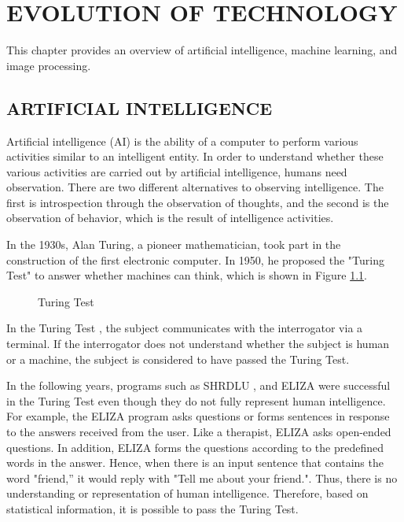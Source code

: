 \chapter{EVOLUTION OF TECHNOLOGY}\label{chp:Evaluation of Technology}

This chapter provides an overview of artificial intelligence, machine learning, and image processing. 

\section{ARTIFICIAL INTELLIGENCE}

Artificial intelligence (AI) is the ability of a computer to perform various activities similar to an intelligent entity. In order to understand whether these various activities are carried out by artificial intelligence, humans need observation. There are two different alternatives to observing intelligence. The first is introspection through the observation of thoughts, and the second is the observation of behavior, which is the result of intelligence activities.

In the 1930s, Alan Turing, a pioneer mathematician, took part in the construction of the first electronic computer. In 1950, he proposed the "Turing Test" to answer whether machines can think, which is shown in Figure \ref{fig:TuringTest}.

\begin{figure}[htbp]
\centering
{}
\caption{Turing Test \cite{russel2010}}
\label{fig:TuringTest}
\end{figure}

In the Turing Test \cite{turing2009computing}, the subject communicates with the interrogator via a terminal. If the interrogator does not understand whether the subject is human or a machine, the subject is considered to have passed the Turing Test.

In the following years, programs such as SHRDLU \cite{winograd1972understanding}, and ELIZA \cite{mauldin1994chatterbots} were successful in the Turing Test even though they do not fully represent human intelligence. For example, the ELIZA program asks questions or forms sentences in response to the answers received from the user. Like a therapist, ELIZA asks open-ended questions. In addition, ELIZA forms the questions according to the predefined words in the answer. Hence, when there is an input sentence that contains the word "friend,'' it would reply with "Tell me about your friend.". Thus, there is no understanding or representation of human intelligence. Therefore, based on statistical information, it is possible to pass the Turing Test.

